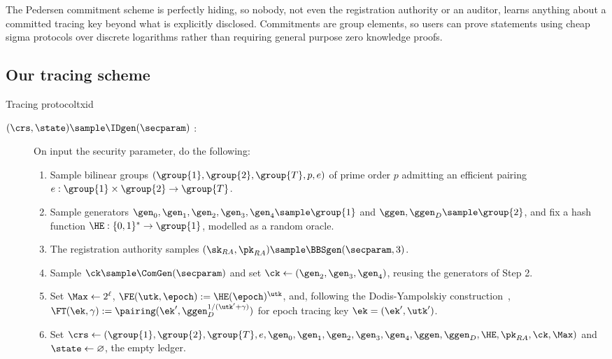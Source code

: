 The Pedersen commitment scheme is perfectly hiding, so nobody, not even the
registration authority or an auditor, learns anything about a committed tracing
key beyond what is explicitly disclosed.  Commitments are group elements, so
users can prove statements using cheap sigma protocols over discrete logarithms
rather than requiring general purpose zero knowledge proofs.

\subsection{Our tracing scheme}\label{sec:algebraic}

\begin{protocolbox}{Tracing protocol}{txid}

  \begin{description}

    \item[$(\crs,\state) \sample \IDgen(\secparam)$ :] On input the security
      parameter, do the following:

      \begin{enumerate}

        \item Sample bilinear groups $(\group{1},\group{2},\group{T},p,e)$ of
          prime order $p$ admitting an efficient pairing $e: \group{1} \times
          \group{2} \to \group{T}$.

        \item Sample generators $\gen_0,\gen_1,\gen_2,\gen_3,\gen_4 \sample
          \group{1}$ and $\ggen,\ggen_D \sample \group{2}$, and fix a hash
          function $\HE : \{0,1\}^* \to \group{1}$, modelled as a random
          oracle.

        \item The registration authority samples $(\sk_{RA},\pk_{RA}) \sample
          \BBSgen(\secparam,3)$.

        \item Sample $\ck \sample \ComGen(\secparam)$ and set $\ck \leftarrow
          (\gen_2,\gen_3,\gen_4)$, reusing the generators of Step 2.

        \item Set $\Max \leftarrow 2^\ell$, $\FE(\utk,\epoch) :=
          \HE(\epoch)^{\utk}$, and, following the Dodis-Yampolskiy
          construction~\cite{PKC:DodYam05}, $\FT(\ek,\gamma) := \pairing(\ek',
          \ggen_D^{1/(\utk'+\gamma)})$ for epoch tracing key $\ek =
          (\ek',\utk')$.

        \item Set $\crs \leftarrow (\group{1},\group{2},\group{T},e,
          \gen_0,\gen_1,\gen_2,\gen_3,\gen_4,\ggen,\ggen_D,\HE,
          \pk_{RA},\ck,\Max)$ and $\state \leftarrow \varnothing$, the empty
          ledger.


\end{enumerate}
\end{description}
\end{protocolbox}
